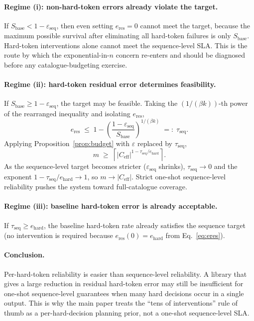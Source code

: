 \documentclass{article}
\theoremstyle{taeplain}
\theoremstyle{taedefn}
\begin{document}
\paragraph{Regime (i): non-hard-token errors already violate the target.}
If $S_{\text{base}} < 1 - \varepsilon_{\text{seq}}$, then even setting $e_{\text{res}} = 0$ cannot meet the target, because the maximum possible survival after eliminating all hard-token failures is only $S_{\text{base}}$. Hard-token interventions alone cannot meet the sequence-level SLA. This is the route by which the exponential-in-$n$ concern re-enters and should be diagnosed before any catalogue-budgeting exercise.

\paragraph{Regime (ii): hard-token residual error determines feasibility.}
If $S_{\text{base}} \geq 1 - \varepsilon_{\text{seq}}$, the target may be feasible. Taking the $(1/(\beta k))$-th power of the rearranged inequality and isolating $e_{\text{res}}$,
\[
e_{\text{res}} \;\leq\; 1 - \left(\frac{1 - \varepsilon_{\text{seq}}}{S_{\text{base}}}\right)^{1 / (\beta k)}
\;=:\; \tau_{\text{seq}}.
\]
Applying Proposition~\ref{prop:budget} with $\varepsilon$ replaced by $\tau_{\text{seq}}$,
\[
m \;\geq\; \left\lceil |C_{\text{eff}}|^{1 - \tau_{\text{seq}} / e_{\text{hard}}} \right\rceil.
\]
As the sequence-level target becomes stricter ($\varepsilon_{\text{seq}}$ shrinks), $\tau_{\text{seq}} \to 0$ and the exponent $1 - \tau_{\text{seq}}/e_{\text{hard}} \to 1$, so $m \to |C_{\text{eff}}|$. Strict one-shot sequence-level reliability pushes the system toward full-catalogue coverage.

\paragraph{Regime (iii): baseline hard-token error is already acceptable.}
If $\tau_{\text{seq}} \geq e_{\text{hard}}$, the baseline hard-token rate already satisfies the sequence target (no intervention is required because $e_{\text{res}}(0) = e_{\text{hard}}$ from Eq.~\eqref{eq:eres}).

\paragraph{Conclusion.}
Per-hard-token reliability is easier than sequence-level reliability. A library that gives a large reduction in residual hard-token error may still be insufficient for one-shot sequence-level guarantees when many hard decisions occur in a single output. This is why the main paper treats the ``tens of interventions'' rule of thumb as a per-hard-decision planning prior, not a one-shot sequence-level SLA.
\end{document}
